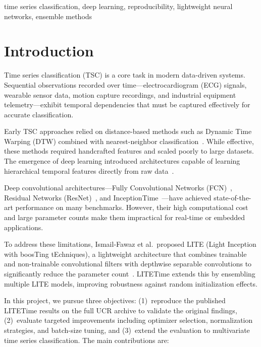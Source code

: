 \documentclass[conference]{IEEEtran}
\begin{document}
\begin{IEEEkeywords}
time series classification, deep learning, reproducibility, lightweight neural networks, ensemble methods
\end{IEEEkeywords}

\section{Introduction}

Time series classification (TSC) is a core task in modern data-driven systems. Sequential observations recorded over time---electrocardiogram (ECG) signals, wearable sensor data, motion capture recordings, and industrial equipment telemetry---exhibit temporal dependencies that must be captured effectively for accurate classification.

Early TSC approaches relied on distance-based methods such as Dynamic Time Warping (DTW) combined with nearest-neighbor classification~\cite{keogh2001dtw}. While effective, these methods required handcrafted features and scaled poorly to large datasets. The emergence of deep learning introduced architectures capable of learning hierarchical temporal features directly from raw data~\cite{fawaz2019deep}.

Deep convolutional architectures---Fully Convolutional Networks (FCN)~\cite{wang2017fcn}, Residual Networks (ResNet)~\cite{wang2017fcn}, and InceptionTime~\cite{fawaz2020inceptiontime}---have achieved state-of-the-art performance on many benchmarks. However, their high computational cost and large parameter counts make them impractical for real-time or embedded applications.

To address these limitations, Ismail-Fawaz et al.\ proposed LITE (Light Inception with boosTing tEchniques), a lightweight architecture that combines trainable and non-trainable convolutional filters with depthwise separable convolutions to significantly reduce the parameter count~\cite{ismail2024lite}. LITETime extends this by ensembling multiple LITE models, improving robustness against random initialization effects.

In this project, we pursue three objectives: (1)~reproduce the published LITETime results on the full UCR archive to validate the original findings, (2)~evaluate targeted improvements including optimizer selection, normalization strategies, and batch-size tuning, and (3)~extend the evaluation to multivariate time series classification. The main contributions are:
\end{document}
